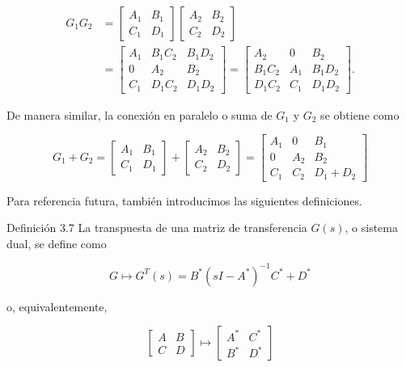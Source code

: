 $$
\begin{aligned}
G_{1} G_{2} & =\left[\begin{array}{c|c}
A_{1} & B_{1} \\
\hline C_{1} & D_{1}
\end{array}\right]\left[\begin{array}{c|c}
A_{2} & B_{2} \\
\hline C_{2} & D_{2}
\end{array}\right] \\
& =\left[\begin{array}{cc|c}
A_{1} & B_{1} C_{2} & B_{1} D_{2} \\
0 & A_{2} & B_{2} \\
\hline C_{1} & D_{1} C_{2} & D_{1} D_{2}
\end{array}\right]=\left[\begin{array}{cc|c}
A_{2} & 0 & B_{2} \\
B_{1} C_{2} & A_{1} & B_{1} D_{2} \\
\hline D_{1} C_{2} & C_{1} & D_{1} D_{2}
\end{array}\right] .
\end{aligned}
$$

De manera similar, la conexión en paralelo o suma de $G_{1}$ y $G_{2}$ se obtiene como

$$
G_{1}+G_{2}=\left[\begin{array}{c|c}
A_{1} & B_{1} \\
\hline C_{1} & D_{1}
\end{array}\right]+\left[\begin{array}{c|c}
A_{2} & B_{2} \\
\hline C_{2} & D_{2}
\end{array}\right]=\left[\begin{array}{cc|c}
A_{1} & 0 & B_{1} \\
0 & A_{2} & B_{2} \\
\hline C_{1} & C_{2} & D_{1}+D_{2}
\end{array}\right]
$$

Para referencia futura, también introducimos las siguientes definiciones.

Definición 3.7 La transpuesta de una matriz de transferencia $G(s)$, o sistema dual, se define como

$$
G \longmapsto G^{T}(s)=B^{*}\left(s I-A^{*}\right)^{-1} C^{*}+D^{*}
$$

o, equivalentemente,

$$
\left[\begin{array}{c|c}
A & B \\
\hline C & D
\end{array}\right] \longmapsto\left[\begin{array}{c|c}
A^{*} & C^{*} \\
\hline B^{*} & D^{*}
\end{array}\right]
$$

